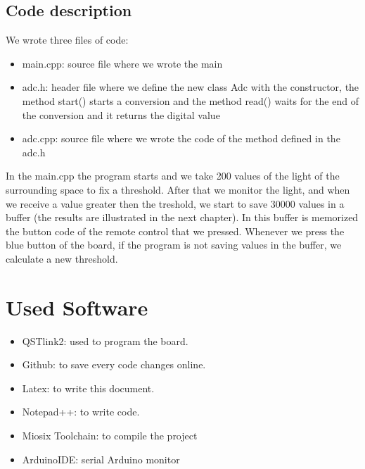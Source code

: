 \documentclass[18pt,oneside,a4paper,titlepage]{article}
\begin{document}
	\subsection{Code description}
		We wrote three files of code:
		\begin{itemize}
			\item main.cpp: source file where we wrote the main
			\item adc.h: header file where we define the new class Adc with the constructor, the method start() starts a conversion and the method read() waits for the end of the conversion and it returns the digital value
			\item adc.cpp: source file where we wrote the code of the method defined in the adc.h
		\end{itemize}
		In the main.cpp the program starts and we take 200 values of the light of the surrounding space to fix a threshold. After that we monitor the light, and when we receive a value greater then the treshold, we start to save 30000 values in a buffer (the results are illustrated in the next chapter). In this buffer is memorized the button code of the remote control that we pressed. Whenever we press the blue button of the board, if the program is not saving values in the buffer, we calculate a new threshold. 
\newpage
		
\newpage
\section{Used Software}
\begin{itemize}
	\item QSTlink2: used to program the board.
	\item Github: to save every code changes  online.
	\item Latex: to write this document.
	\item Notepad++: to write code.
	\item Miosix Toolchain: to compile the project
	\item ArduinoIDE: serial Arduino monitor 

\end{itemize}
\end{document}

